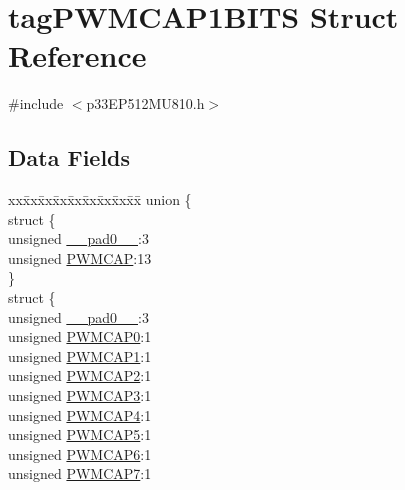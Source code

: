 \hypertarget{structtag_p_w_m_c_a_p1_b_i_t_s}{}\section{tag\+P\+W\+M\+C\+A\+P1\+B\+I\+TS Struct Reference}
\label{structtag_p_w_m_c_a_p1_b_i_t_s}


{\ttfamily \#include $<$p33\+E\+P512\+M\+U810.\+h$>$}

\subsection*{Data Fields}
\begin{DoxyCompactItemize}
\item 
\begin{tabbing}
xx\=xx\=xx\=xx\=xx\=xx\=xx\=xx\=xx\=\kill
union \{\\
\>struct \{\\
\>\>unsigned \hyperlink{structtag_p_w_m_c_a_p1_b_i_t_s_adf71f3d8410c1f1dbbc96680a92c49af}{\_\_pad0\_\_}:3\\
\>\>unsigned \hyperlink{structtag_p_w_m_c_a_p1_b_i_t_s_a3877a5299772d03214ef452994c53979}{PWMCAP}:13\\
\>\} \\
\>struct \{\\
\>\>unsigned \hyperlink{structtag_p_w_m_c_a_p1_b_i_t_s_adf71f3d8410c1f1dbbc96680a92c49af}{\_\_pad0\_\_}:3\\
\>\>unsigned \hyperlink{structtag_p_w_m_c_a_p1_b_i_t_s_a34c685289d01ac79a9b067b945e411b0}{PWMCAP0}:1\\
\>\>unsigned \hyperlink{structtag_p_w_m_c_a_p1_b_i_t_s_a4c90f0d96eece06b7d6c7e41e394b417}{PWMCAP1}:1\\
\>\>unsigned \hyperlink{structtag_p_w_m_c_a_p1_b_i_t_s_a2111a4368f6512c24cf193f6c83672e3}{PWMCAP2}:1\\
\>\>unsigned \hyperlink{structtag_p_w_m_c_a_p1_b_i_t_s_a5d3e7376fc29096ef98492e81f73590d}{PWMCAP3}:1\\
\>\>unsigned \hyperlink{structtag_p_w_m_c_a_p1_b_i_t_s_a07f7fb680f8c9bdd5d3c94a84a30a7b5}{PWMCAP4}:1\\
\>\>unsigned \hyperlink{structtag_p_w_m_c_a_p1_b_i_t_s_a434b71ab2093a53faf535c8f27973f7b}{PWMCAP5}:1\\
\>\>unsigned \hyperlink{structtag_p_w_m_c_a_p1_b_i_t_s_a4249adbed71df183d967bd51f8d811fa}{PWMCAP6}:1\\
\>\>unsigned \hyperlink{structtag_p_w_m_c_a_p1_b_i_t_s_a282c7ae90ac64b1a78eb1351a7d0eee0}{PWMCAP7}:1\\

\end{tabbing}
\end{DoxyCompactItemize}
